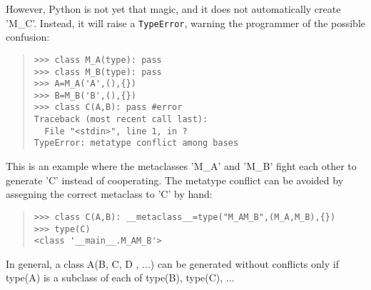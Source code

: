 \documentclass[10pt,english]{article}
\begin{document}
However, Python is not yet that magic, and it does not automatically create 
'M{\_}C'. Instead, it will raise a \texttt{TypeError}, warning the programmer of
the possible confusion:
\begin{quote}
\begin{verbatim}>>> class M_A(type): pass
>>> class M_B(type): pass
>>> A=M_A('A',(),{})
>>> B=M_B('B',(),{})
>>> class C(A,B): pass #error
Traceback (most recent call last):
  File "<stdin>", line 1, in ?
TypeError: metatype conflict among bases\end{verbatim}
\end{quote}

This is an example where the metaclasses 'M{\_}A' and 'M{\_}B' fight each other
to generate 'C' instead of cooperating. The metatype conflict can be avoided 
by assegning the correct metaclass to 'C' by hand:
\begin{quote}
\begin{verbatim}>>> class C(A,B): __metaclass__=type("M_AM_B",(M_A,M_B),{})
>>> type(C)
<class '__main__.M_AM_B'>\end{verbatim}
\end{quote}

In general, a class A(B, C, D , ...) can be generated without conflicts only
if type(A) is a  subclass of each of type(B), type(C), ...
\end{document}
